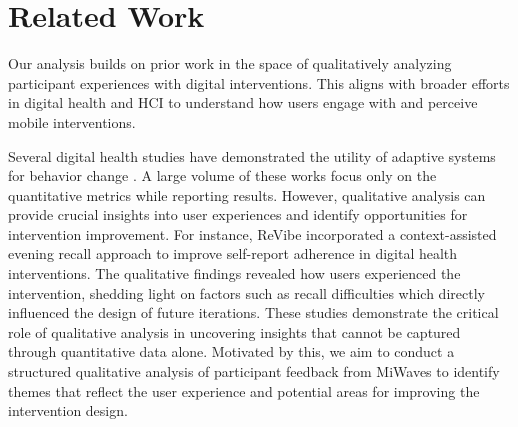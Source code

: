 \section{Related Work}
\label{sec:related_work}
Our analysis builds on prior work in the space of qualitatively analyzing participant experiences with digital interventions. This aligns with broader efforts in digital health and HCI to understand how users engage with and perceive mobile interventions.

Several digital health studies have demonstrated the utility of adaptive systems for behavior change \cite{nahum2018jitai,aschentrup2024effectiveness}. 
A large volume of these works \cite{mcclure2023feasibility,klasnja2019efficacy,
golbus2024text} focus only on the quantitative metrics while reporting results. 
However, qualitative analysis can provide crucial insights into user experiences and identify opportunities for intervention improvement. 
For instance, ReVibe \cite{rabbi2019revibe} incorporated a context-assisted evening recall approach to improve self-report adherence in digital health interventions. The qualitative findings revealed how users experienced the intervention, shedding light on factors such as recall difficulties which directly influenced the design of future iterations. These studies demonstrate the critical role of qualitative analysis in uncovering insights that cannot be captured through quantitative data alone. Motivated by this, we aim to conduct a structured qualitative analysis of participant feedback from MiWaves to identify themes that reflect the user experience and potential areas for improving the intervention design.


